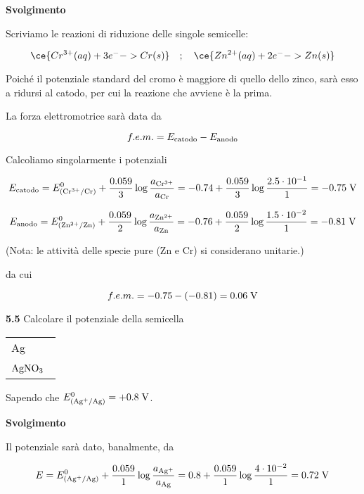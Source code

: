 \vspace{0.2cm}\large\textbf{Svolgimento}\normalsize

\vspace{0.2cm}Scriviamo le reazioni di riduzione delle singole semicelle:

$$\ce{Cr^{3+}(aq) + 3 e^- -> Cr(s)}
\quad;\quad
\ce{Zn^{2+}(aq) + 2 e^- -> Zn(s)}$$

Poiché il potenziale standard del cromo è maggiore di quello dello zinco, sarà esso a ridursi al catodo, per cui la reazione che avviene è la prima.

La forza elettromotrice sarà data da

$$f.e.m. = E_{\rm catodo} - E_{\rm anodo}$$

Calcoliamo singolarmente i potenziali

$$E_{\rm catodo}
=E^0_{(\rm Cr^{3+}/Cr)} + \frac{0.059}{3} \log \frac{a_{\rm Cr^{3+}}}{a_{\rm Cr}}
=-0.74 + \frac{0.059}{3} \log \frac{2.5 \cdot 10^{-1}}{1}
=-0.75 \; \rm V$$

$$E_{\rm anodo} = E^0_{(\rm Zn^{2+}/Zn)} + \frac{0.059}{2} \log \frac{a_{\rm Zn^{2+}}}{a_{\rm Zn}}
=-0.76 + \frac{0.059}{2} \log \frac{1.5 \cdot 10^{-2}}{1}
=-0.81 \; \rm V$$

(Nota: le attività delle specie pure (Zn e Cr) si considerano unitarie.)

da cui

$$f.e.m.=-0.75 - (-0.81) = 0.06 \; \rm V$$

\vspace{0.2cm}\textbf{5.5} Calcolare il potenziale della semicella

\begin{center}
    \begin{tabular}{|p{3.7cm}|}
         Ag\\[0.5ex]
         $\rm AgNO_3$ \, \\[0.5ex]
    \end{tabular}
\end{center}

Sapendo che $E^{0}_{(\rm Ag^{+}/Ag)}=+0.8 \; \rm V$.

\vspace{0.2cm}\large\textbf{Svolgimento}\normalsize

\vspace{0.2cm}Il potenziale sarà dato, banalmente, da

$$E = E^0_{(\rm Ag^{+}/Ag)} + \frac{0.059}{1} \log \frac{a_{\rm Ag^{+}}}{a_{\rm Ag}}
=0.8 + \frac{0.059}{1} \log \frac{4 \cdot 10^{-2}}{1}
=0.72 \; \rm V$$

